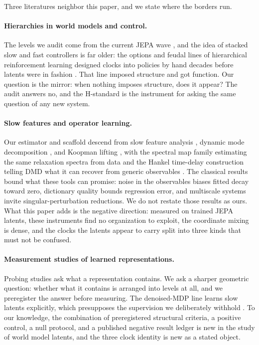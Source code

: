 \documentclass[11pt]{article}
\begin{document}
Three literatures neighbor this paper, and we state where the borders run.

\paragraph{Hierarchies in world models and control.}
The levels we audit come from the current JEPA wave \citep{hjepa,lewm,jeapa5g}, and the idea of stacked slow and fast controllers is far older: the options and feudal lines of hierarchical reinforcement learning designed clocks into policies by hand decades before latents were in fashion \citep{sutton99,hiro}.
That line imposed structure and got function.
Our question is the mirror: when nothing imposes structure, does it appear?
The audit answers no, and the H-standard is the instrument for asking the same question of any new system.

\paragraph{Slow features and operator learning.}
Our estimator and scaffold descend from slow feature analysis \citep{sfa}, dynamic mode decomposition \citep{dmd}, and Koopman lifting \citep{koopman_edmd}, with the spectral map family estimating the same relaxation spectra from data \citep{spectralmaps} and the Hankel time-delay construction telling DMD what it can recover from generic observables \citep{arbabi17}.
The classical results bound what these tools can promise: noise in the observables biases fitted decay toward zero, dictionary quality bounds regression error, and multiscale systems invite singular-perturbation reductions.
We do not restate those results as ours.
What this paper adds is the negative direction: measured on trained JEPA latents, these instruments find no organization to exploit, the coordinate mixing is dense, and the clocks the latents appear to carry split into three kinds that must not be confused.

\paragraph{Measurement studies of learned representations.}
Probing studies ask what a representation contains.
We ask a sharper geometric question: whether what it contains is arranged into levels at all, and we preregister the answer before measuring.
The denoised-MDP line learns slow latents explicitly, which presupposes the supervision we deliberately withhold \citep{dmdp}.
To our knowledge, the combination of preregistered structural criteria, a positive control, a null protocol, and a published negative result ledger is new in the study of world model latents, and the three clock identity is new as a stated object.
\end{document}
